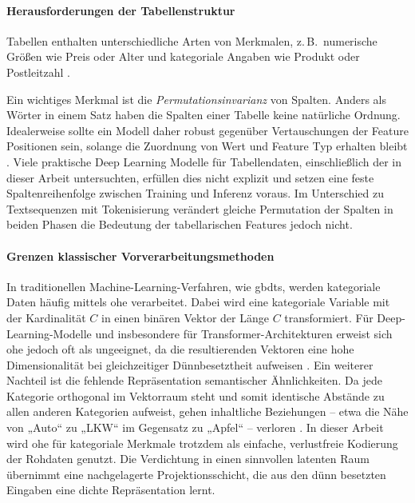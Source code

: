 \paragraph{Herausforderungen der Tabellenstruktur}
Tabellen enthalten unterschiedliche Arten von Merkmalen, z.\,B.\ numerische Größen wie Preis oder Alter und kategoriale Angaben wie Produkt oder Postleitzahl \cite{Borisov2024, Badaro2023}. 

Ein wichtiges Merkmal ist die \textit{Permutationsinvarianz} von Spalten. Anders als Wörter in einem Satz haben die Spalten einer Tabelle keine natürliche Ordnung. Idealerweise sollte ein Modell daher robust gegenüber Vertauschungen der Feature Positionen sein, solange die Zuordnung von Wert und Feature Typ erhalten bleibt \cite{Gorishniy2021}. Viele praktische Deep Learning Modelle für Tabellendaten, einschließlich der in dieser Arbeit untersuchten, erfüllen dies nicht explizit und setzen eine feste Spaltenreihenfolge zwischen Training und Inferenz voraus. Im Unterschied zu Textsequenzen mit Tokenisierung verändert gleiche Permutation der Spalten in beiden Phasen die Bedeutung der tabellarischen Features jedoch nicht.

\paragraph{Grenzen klassischer Vorverarbeitungsmethoden}
In traditionellen Machine\allowbreak-Learning\allowbreak-Verfahren, wie \Glspl{gbdt}, werden kategoriale Daten häufig mittels \Gls{ohe} verarbeitet. Dabei wird eine kategoriale Variable mit der Kardinalität $C$ in einen binären Vektor der Länge $C$ transformiert. 
Für Deep-Learning-Modelle und insbesondere für Transformer-Architekturen erweist sich \gls{ohe} jedoch oft als ungeeignet, da die resultierenden Vektoren eine hohe Dimensionalität bei gleichzeitiger Dünnbesetztheit aufweisen \cite{Huang2020, Gorishniy2021}.
Ein weiterer Nachteil ist die fehlende Repräsentation semantischer Ähnlichkeiten. Da jede Kategorie orthogonal im Vektorraum steht und somit identische Abstände zu allen anderen Kategorien aufweist, gehen inhaltliche Beziehungen – etwa die Nähe von „Auto“ zu „LKW“ im Gegensatz zu „Apfel“ – verloren \cite{Huang2020}. In dieser Arbeit wird \gls{ohe} für kategoriale Merkmale trotzdem als einfache, verlustfreie Kodierung der Rohdaten genutzt. Die Verdichtung in einen sinnvollen latenten Raum übernimmt eine nachgelagerte Projektionsschicht, die aus den dünn besetzten Eingaben eine dichte Repräsentation lernt.


